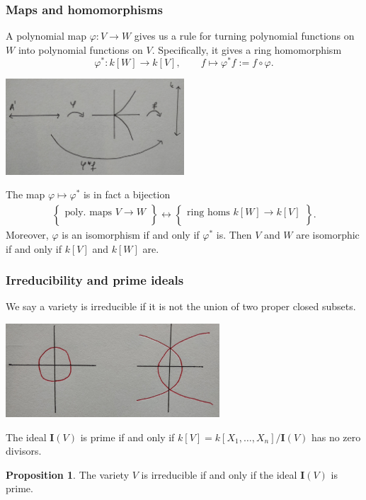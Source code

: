 \documentclass{beamer}
\theoremstyle{definition}
\theoremstyle{definition}
\newtheorem{proposition}{Proposition}
\begin{document}
\begin{frame}
\frametitle{Maps and homomorphisms}
A polynomial map $\varphi : V \to W$ gives us a rule for turning polynomial functions on $W$ into polynomial functions on $V$.
Specifically, it gives a ring \alert{homomorphism}
$$\varphi^* : k[W] \to k[V], \qquad f \mapsto \varphi^* f := f \circ \varphi.$$
\centerline{\includegraphics[width=0.5\textwidth]{pullback}}
The map $\varphi \mapsto \varphi^*$ is in fact a bijection
\begin{align*}
\left\{
\begin{array}{c}
	\text{poly. maps } V \to W \\
\end{array}
\right\} \longleftrightarrow 
\left\{
\begin{array}{c}
	\text{ring homs } k[W] \to k[V] \\
\end{array}
\right\}.
\end{align*}
Moreover, $\varphi$ is an isomorphism if and only if $\varphi^*$ is.
Then $V$ and $W$ are isomorphic if and only if $k[V]$ and $k[W]$ are.
\end{frame}

\begin{frame}
\frametitle{Irreducibility and prime ideals}
We say a variety is \alert{irreducible} if it is not the union of two proper closed subsets.
\centerline{\includegraphics[width=0.6\textwidth]{irreducibility}}
The ideal $\mathbf{I}(V)$ is \alert{prime} if and only if $k[V] = k[X_1, \ldots, X_n]/\mathbf{I}(V)$ has no zero divisors.

\begin{proposition}
The variety $V$ is irreducible if and only if the ideal $\mathbf{I}(V)$ is prime.
\end{proposition}
\end{frame}
\end{document}
